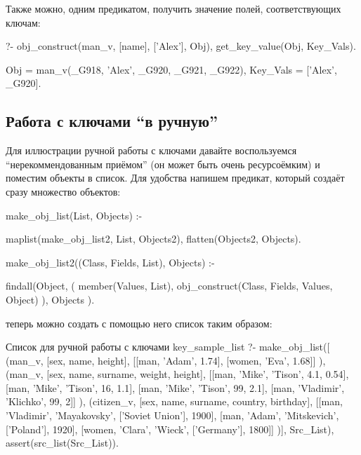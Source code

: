 \documentclass[a4paper]{book}
\begin{document}
Также можно, одним предикатом, получить значение полей,
соответствующих ключам:

\begin{example}{}{}
?- obj_construct(man_v, [name], ['Alex'], Obj), 
   get_key_value(Obj, Key_Vals).                                                        

Obj = man_v(_G918, 'Alex', _G920, _G921, _G922),
Key_Vals = ['Alex', _G920].
\end{example}

\subsection{Работа с ключами ``в ручную''}

Для иллюстрации ручной работы с ключами давайте воспользуемся
``нерекоммендованным приёмом'' (он может быть очень ресурсоёмким)
и поместим объекты в список. Для удобства напишем предикат,
который создаёт сразу множество объектов:

\begin{example}{}{}
make_obj_list(List, Objects) :-

   maplist(make_obj_list2, List, Objects2),
   flatten(Objects2, Objects).

make_obj_list2((Class, Fields, List), Objects) :-

   findall(Object,
           (  member(Values, List),
              obj_construct(Class, Fields, Values, Object)
           ),
           Objects
          ).
\end{example}

теперь можно создать с помощью него список таким образом:

\begin{bigexample}{Список для ручной работы с ключами}%
                  {key_sample_list}
?- make_obj_list([
     (man_v, [sex, name, height],
        [[man, 'Adam', 1.74], 
         [women, 'Eva', 1.68]]
     ),
     (man_v, [sex, name, surname, weight, height],
        [[man, 'Mike', 'Tison', 4.1, 0.54],
         [man, 'Mike', 'Tison', 16, 1.1],
         [man, 'Mike', 'Tison', 99, 2.1],
         [man, 'Vladimir', 'Klichko', 99, 2]]
     ),
     (citizen_v, [sex, name, surname, country, birthday],
        [[man, 'Vladimir', 'Mayakovsky', ['Soviet Union'], 1900],
         [man, 'Adam', 'Mitskevich', ['Poland'], 1920],
         [women, 'Clara', 'Wieck', ['Germany'], 1800]]
     )],
     Src_List),
   assert(src_list(Src_List)).
\end{bigexample}
\end{document}
